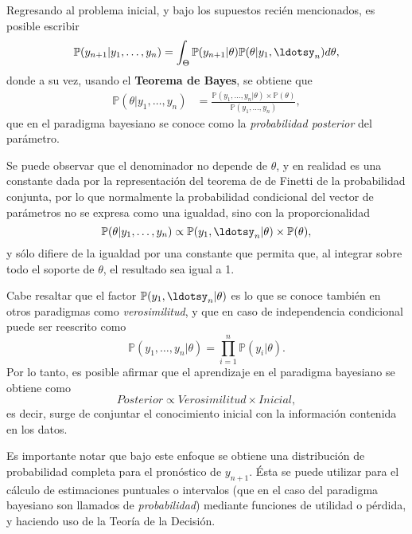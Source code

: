 Regresando al problema inicial, y bajo los supuestos reci\'en mencionados, es posible escribir
\begin{equation*}
    \mathbb{P}(y_{n+1} | y_1,\ldots,y_n) =
    \int_{\Theta} 
    \mathbb{P}(y_{n+1}|\theta) \mathbb{P}(\theta|y_1,\ldotsy_n)d\theta,
\end{equation*}
donde a su vez, usando el \textbf{Teorema de Bayes}, se obtiene que
\begin{equation*}
\begin{aligned}
    \mathbb{P}(\theta|y_1,\ldots,y_n) &=
    \frac{\mathbb{P}(y_1,\ldots,y_n|\theta)\times\mathbb{P}(\theta)}
    {\mathbb{P}(y_1,\ldots,y_n)},
\end{aligned}
\end{equation*}
que en el paradigma bayesiano se conoce como la \textit{probabilidad posterior} del par\'ametro. 

Se puede observar que el denominador no depende de $\theta$, y en realidad es una constante dada por la representaci\'on del teorema de de Finetti de la probabilidad conjunta, por lo que normalmente la probabilidad condicional del vector de par\'ametros no se expresa como una igualdad, sino con la proporcionalidad
\begin{equation*}
    \mathbb{P}(\theta|y_1,\ldots,y_n) 
    \propto 
    \mathbb{P}(y_1,\ldotsy_n|\theta) \times \mathbb{P}(\theta),
\end{equation*}
y s\'olo difiere de la igualdad por una constante que permita que, al integrar sobre todo el soporte de $\theta$, el resultado sea igual a 1.

Cabe resaltar que el factor $\mathbb{P}(y_1,\ldotsy_n|\theta)$ es lo que se conoce tambi\'en en otros paradigmas como \textit{verosimilitud}, y que en caso de independencia condicional puede ser reescrito como
\begin{equation*}
    \mathbb{P}(y_1,\ldots,y_n|\theta)  = \prod_{i=1}^n \mathbb{P}(y_i|\theta).
\end{equation*}
Por lo tanto, es posible afirmar que el aprendizaje en el paradigma bayesiano se obtiene como
\begin{equation*}
    Posterior \propto Verosimilitud \times Inicial,
\end{equation*}
es decir, surge de conjuntar el conocimiento inicial con la informaci\'on contenida en los datos.

Es importante notar que bajo este enfoque se obtiene una distribuci\'on de probabilidad completa para  el pron\'ostico de $y_{n+1}$. \'Esta se puede utilizar para el c\'alculo de estimaciones puntuales o intervalos (que en el caso del paradigma bayesiano son llamados de \textit{probabilidad}) mediante funciones de utilidad o p\'erdida, y haciendo uso de la Teor\'ia de la Decisi\'on.

